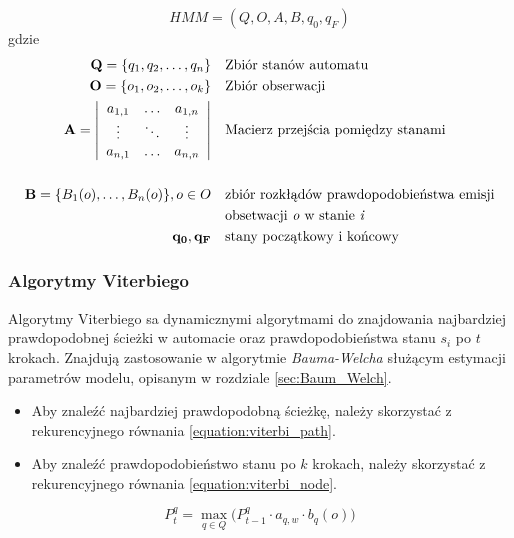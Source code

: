 \documentclass[11pt]{article}
\begin{document}
	    \begin{equation}
		    HMM = (Q, O, A, B, q_0, q_F)
		    \label{equation:HMM_def}
	    \end{equation}
	    gdzie
	    \begin{align*}
		    \mathbf{Q}=\{q_1, q_2,\ldots,q_n\} & &&  \text{Zbiór stanów automatu} \\
	 	    \mathbf{O}=\{o_1, o_2,\ldots,o_k\} & &&  \text{Zbiór obserwacji} \\
	 	    \mathbf{A} =
	 	    \left| \begin{array}{ccc}
		 	    a_{1,1} & \ldots & a_{1,n} \\
		 	    \vdots  & \ddots & \vdots\\
		 	    a_{n,1} & \ldots & a_{n,n}
	 	    \end{array} \right|
												 	    & &&  \text{Macierz przejścia pomiędzy stanami} \\
												 	    & && \\
	 	    \mathbf{B}=\{B_1(o),\ldots,B_n(o)\},o \in O & && \text{zbiór rozkłądów prawdopodobieństwa emisji} \\ 
													 	& && \text{obsetwacji \textit{o} w stanie \textit{i}} \\
		 	\mathbf{q_0, q_F}				  & && \text{stany początkowy i końcowy}
	    \end{align*}
	    
	   \subsubsection{Algorytmy Viterbiego}
		   \label{sec:Viterbi}
		   Algorytmy Viterbiego sa dynamicznymi algorytmami do znajdowania najbardziej prawdopodobnej ścieżki w automacie oraz prawdopodobieństwa stanu $s_i$ po $t$ krokach. Znajdują zastosowanie w algorytmie \textit{Bauma-Welcha} służącym estymacji parametrów modelu, opisanym w rozdziale \ref{sec:Baum_Welch}.
		   
		   \begin{itemize}
			   	\item Aby znaleźć najbardziej prawdopodobną ścieżkę, należy skorzystać z rekurencyjnego równania \ref{equation:viterbi_path}.
			   	\item Aby znaleźć prawdopodobieństwo stanu po $k$ krokach, należy skorzystać z rekurencyjnego równania \ref{equation:viterbi_node}.
		   \end{itemize}
	   	   
		   \begin{equation}
		   P_t^q=\max_{q \in Q} \bigg( P_{t-1}^q\cdot a_{q,w}\cdot b_q(o) \bigg)
		   \label{equation:viterbi_path}
		   \end{equation}
		   
\end{document}
